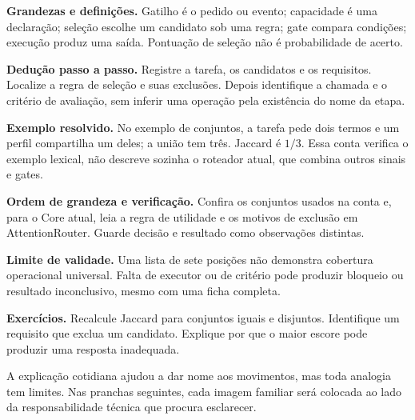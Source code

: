 \begin{definicao}
\textbf{Grandezas e definições.} Gatilho é o pedido ou evento; capacidade é uma declaração; seleção escolhe um candidato sob uma regra; gate compara condições; execução produz uma saída. Pontuação de seleção não é probabilidade de acerto.
\end{definicao}

\begin{metodo}
\textbf{Dedução passo a passo.} Registre a tarefa, os candidatos e os requisitos. Localize a regra de seleção e suas exclusões. Depois identifique a chamada e o critério de avaliação, sem inferir uma operação pela existência do nome da etapa.
\end{metodo}

\begin{resultado}
\textbf{Exemplo resolvido.} No exemplo de conjuntos, a tarefa pede dois termos e um perfil compartilha um deles; a união tem três. Jaccard é $1/3$. Essa conta verifica o exemplo lexical, não descreve sozinha o roteador atual, que combina outros sinais e gates.
\end{resultado}

\begin{resultado}
\textbf{Ordem de grandeza e verificação.} Confira os conjuntos usados na conta e, para o Core atual, leia a regra de utilidade e os motivos de exclusão em AttentionRouter. Guarde decisão e resultado como observações distintas.
\end{resultado}

\begin{aviso}
\textbf{Limite de validade.} Uma lista de sete posições não demonstra cobertura operacional universal. Falta de executor ou de critério pode produzir bloqueio ou resultado inconclusivo, mesmo com uma ficha completa.
\end{aviso}

\begin{resultado}
\textbf{Exercícios.} Recalcule Jaccard para conjuntos iguais e disjuntos. Identifique um requisito que exclua um candidato. Explique por que o maior escore pode produzir uma resposta inadequada.
\end{resultado}

A explicação cotidiana ajudou a dar nome aos movimentos, mas toda analogia tem limites. Nas pranchas seguintes, cada imagem familiar será colocada ao lado da responsabilidade técnica que procura esclarecer.
